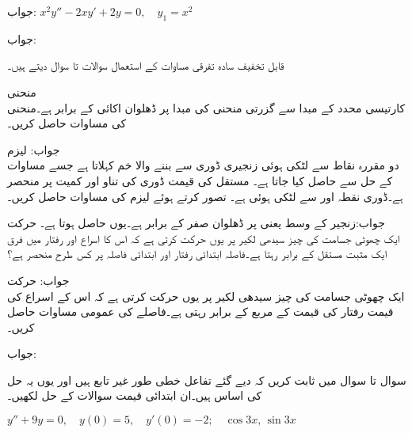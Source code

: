 جواب:
$x^2y''-2xy'+2y=0, \quad y_1=x^2$

جواب:

قابل تخفیف سادہ تفرقی مساوات کے استعمال سوالات  تا سوال  دیتے ہیں۔

\quad منحنی\\
کارتیسی محدد کے مبدا سے گزرتی منحنی  کی مبدا پر ڈھلوان اکائی کے برابر ہے۔منحنی کی مساوات حاصل کریں۔

جواب:
\quad لیزم\\
دو مقررہ نقاط سے لٹکی ہوئی زنجیری ڈوری سے بننے والا خم  کہلاتا ہے جسے مساوات
  کے حل سے حاصل کیا جاتا ہے۔ مستقل  کی قیمت ڈوری کی تناو اور  کمیت پر منحصر ہے۔ڈوری نقطہ   اور  سے لٹکی ہوئی ہے۔  تصور کرتے ہوئے  لیزم کی مساوات حاصل کریں۔

جواب:زنجیر کے وسط یعنی پر ڈھلوان صفر کے برابر ہے۔یوں  حاصل ہوتا ہے۔
\quad حرکت\\
ایک چھوٹی جسامت کی چیز سیدھی لکیر پر یوں حرکت کرتی ہے کہ اس کا اسراع اور رفتار میں فرق ایک مثبت مستقل  کے برابر رہتا ہے۔فاصلہ  ابتدائی رفتار  اور ابتدائی فاصلہ  پر کس طرح منحصر ہے؟

جواب: 
\quad حرکت\\
ایک چھوٹی جسامت کی چیز سیدھی لکیر پر یوں حرکت کرتی ہے کہ اس کے اسراع کی قیمت رفتار کی قیمت کے مربع کے برابر رہتی ہے۔فاصلے کی عمومی مساوات حاصل کریں۔

جواب: 

سوال  تا سوال  میں ثابت کریں کہ دیے گئے تفاعل خطی طور غیر تابع ہیں اور یوں یہ حل کی اساس ہیں۔ان ابتدائی قیمت سوالات کے حل لکھیں۔


$y''+9y=0,\quad y(0)=5, \quad y'(0)=-2; \quad \cos 3x,\, \sin 3x$\\

